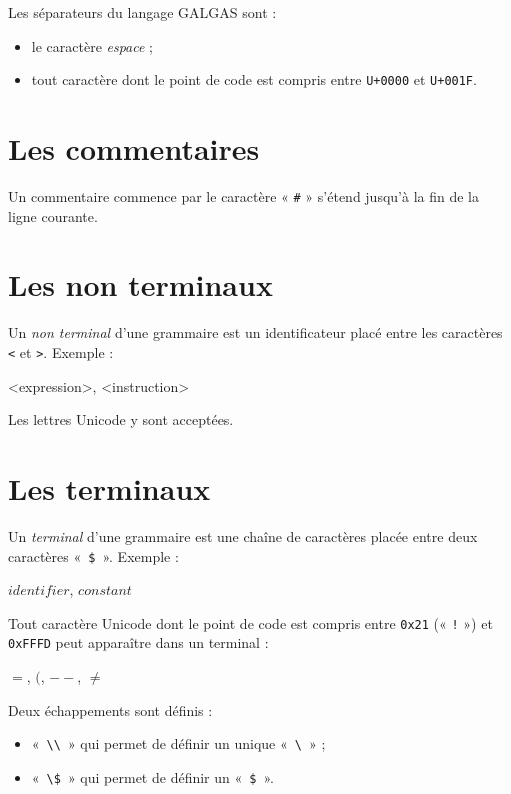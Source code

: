 Les séparateurs du langage GALGAS sont :
\begin{itemize}
  \item le caractère \emph{espace} ;
  \item tout caractère dont le point de code est compris entre \texttt{U+0000} et \texttt{U+001F}. 
\end{itemize}



\section{Les commentaires}

Un commentaire commence par le caractère « \texttt{\#} » s'étend jusqu'à la fin de la ligne courante.








\section{Les non terminaux}

Un \emph{non terminal} d'une grammaire est un identificateur placé entre les caractères \texttt{<} et \texttt{>}. Exemple :

\begin{galgas}
 <expression>, <instruction>
\end{galgas}

Les lettres Unicode y sont acceptées.





\section{Les terminaux}

Un \emph{terminal} d'une grammaire est une chaîne de caractères placée entre deux caractères «~\texttt{\$}~». Exemple :

\begin{galgas}
 $identifier$, $constant$
\end{galgas}

Tout caractère Unicode dont le point de code est compris entre \texttt{0x21} (« \texttt{!} ») et \texttt{0xFFFD} peut apparaître dans un terminal :
\begin{galgas}
 $=$, $($, $--$, $≠$
\end{galgas}

Deux échappements sont définis :
\begin{itemize}
\item «~\texttt{\textbackslash\textbackslash}~» qui permet de définir un unique «~\texttt{\textbackslash}~» ;
\item «~\texttt{\textbackslash\$}~» qui permet de définir un «~\texttt{\$}~».
\end{itemize}

